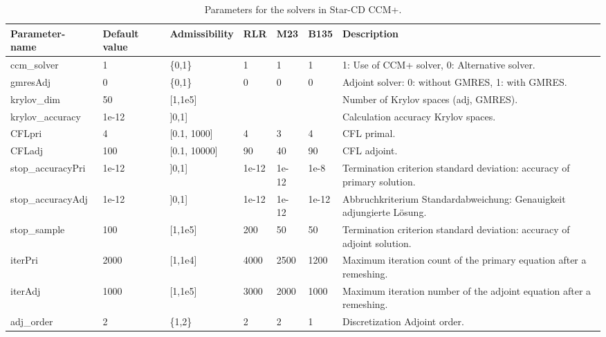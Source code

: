 \documentclass[oneside]{article}
\numberwithin{equation}{section}
\numberwithin{figure}{section}
\numberwithin{figure}{section}
\begin{document}
\begin{table}[h]
    \centering
    \begin{tabular}{|p{2.4cm}|p{1cm}|p{0.9cm}|p{0.9cm}|p{1.1cm}|p{0.9cm}|p{4.8cm}|} %
        \hline
        \cellcolor{light-gray} Parameter- \quad name & \cellcolor{light-gray} Default value & \cellcolor{light-gray} Admissibility & \cellcolor{light-gray} RLR & \cellcolor{light-gray} M23 & \cellcolor{light-gray} B135 & \cellcolor{light-gray} Description\\
        \hline
        ccm\_solver   &   1   & \{0,1\} & 1   & 1 & 1 & 1: Use of CCM+ solver, 0: Alternative solver.\\
        \hline
        gmresAdj     &   0   & \{0,1\} & 0   & 0 &  0 & Adjoint solver: 0: without GMRES, 1: with GMRES.\\
        \hline
        krylov\_dim  &   50   &   [1,1e5]   &    &   &   & Number of Krylov spaces (adj, GMRES).\\
        \hline
        krylov\_accuracy & 1e-12 &  ]0,1]   &    &   &   & Calculation accuracy Krylov spaces.\\
        \hline
        CFLpri       &   4   &   [0.1, 1000]   & 4   & 3 & 4 & CFL primal.\\
        \hline
        CFLadj       &   100   &   [0.1, 10000]    & 90  & 40 & 90 & CFL adjoint.\\
        \hline
        stop\_accuracyPri & 1e-12 & ]0,1]  & 1e-12 & 1e-12 & 1e-8 & Termination criterion standard deviation: accuracy of primary solution.\\
        \hline
        stop\_accuracyAdj & 1e-12 & ]0,1]  & 1e-12 & 1e-12 & 1e-12 & Abbruchkriterium Standardabweichung: Genauigkeit adjungierte Lösung.\\
        \hline
        stop\_sample  &  100  &   [1,1e5]  & 200  & 50 & 50 & Termination criterion standard deviation: accuracy of adjoint solution.\\
        \hline
        iterPri      &   2000   &  [1,1e4] & 4000 & 2500 & 1200 & Maximum iteration count of the primary equation after a remeshing.\\
        \hline
        iterAdj      &   1000   &  [1,1e5] & 3000 & 2000 & 1000 & Maximum iteration number of the adjoint equation after a remeshing.\\
        \hline
        adj\_order     &   2   & \{1,2\} & 2   & 2 &  1  & Discretization Adjoint order.\\
        \hline
    \end{tabular}
    \caption{Parameters for the solvers in Star-CD CCM+.}\label{tab:parameter3}
\end{table}
\end{document}
